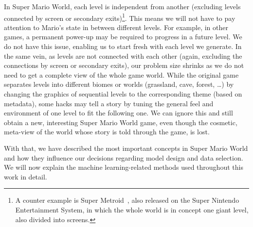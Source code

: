 In Super Mario World, each level is independent from another
(excluding levels connected by screen or secondary exits)\footnote{A
  counter example is Super Metroid~\cite{SuperMetroid2019}, also
  released on the Super Nintendo Entertainment System, in which the
  whole world is in concept one giant level, also divided into
  screens.}. This means we will not have to pay attention to Mario's
state in between different levels. For example, in other games, a
permanent power-up may be required to progress in a future level. We
do not have this issue, enabling us to start fresh with each level we
generate. In the same vein, as levels are not connected with each
other (again, excluding the connections by screen or secondary exits),
our problem size shrinks as we do not need to get a complete view of
the whole game world. While the original game separates levels into
different biomes or worlds (grassland, cave, forest, \dots) by
changing the graphics of sequential levels to the corresponding theme
(based on metadata), some hacks may tell a story by tuning the general
feel and environment of one level to fit the following one. We can
ignore this and still obtain a new, interesting Super Mario World
game, even though the cosmetic, meta-view of the world whose story is
told through the game, is lost.

With that, we have described the most important concepts in Super
Mario World and how they influence our decisions regarding model
design and data selection. We will now explain the machine
learning-related methods used throughout this work in detail.



